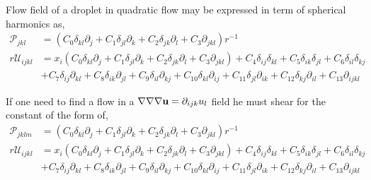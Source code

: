 Flow field of a droplet in quadratic flow may be expressed in term of spherical harmonics as, 
\begin{align}
    \mathcal{P}_{jkl}
    &=
    (C_0 \delta_{kl}\partial_j
    + C_1 \delta_{jl}\partial_k
    + C_2 \delta_{jk}\partial_l
    + C_3 \partial_{jkl})r^{-1}\\
    r \mathcal{U}_{ijkl}
    &=
    x_i 
    (C_0 \delta_{kl}\partial_j
    + C_1 \delta_{jl}\partial_k
    + C_2 \delta_{jk}\partial_l
    + C_3 \partial_{jkl})
    + C_4\delta_{ij}\delta_{kl}
    + C_5\delta_{ik}\delta_{jl}
    + C_6\delta_{il}\delta_{kj}\\
    &
    + C_7\delta_{ij}\partial_{kl}
    + C_8\delta_{ik}\partial_{jl}
    + C_9\delta_{il}\partial_{kj}
    + C_{10}\delta_{kl}\partial_{ij}
    + C_{11}\delta_{jl}\partial_{ik}
    + C_{12}\delta_{kj}\partial_{il}
    + C_{13}\partial_{ijkl}
\end{align}


If one need to find a flow in a $\mathbf{\nabla}\mathbf{\nabla}\mathbf{\nabla} \textbf{u} = \partial_{ijk}u_l$ field he must shear for the constant of the form of, 
\begin{align}
    \mathcal{P}_{jklm}
    &=
    (C_0 \delta_{kl}\partial_j
    + C_1 \delta_{jl}\partial_k
    + C_2 \delta_{jk}\partial_l
    + C_3 \partial_{jkl}
    )r^{-1}\\
    r \mathcal{U}_{ijkl}
    &=
    x_i 
    (C_0 \delta_{kl}\partial_j
    + C_1 \delta_{jl}\partial_k
    + C_2 \delta_{jk}\partial_l
    + C_3 \partial_{jkl})
    + C_4\delta_{ij}\delta_{kl}
    + C_5\delta_{ik}\delta_{jl}
    + C_6\delta_{il}\delta_{kj}\\
    &
    + C_7\delta_{ij}\partial_{kl}
    + C_8\delta_{ik}\partial_{jl}
    + C_9\delta_{il}\partial_{kj}
    + C_{10}\delta_{kl}\partial_{ij}
    + C_{11}\delta_{jl}\partial_{ik}
    + C_{12}\delta_{kj}\partial_{il}
    + C_{13}\partial_{ijkl}
\end{align}